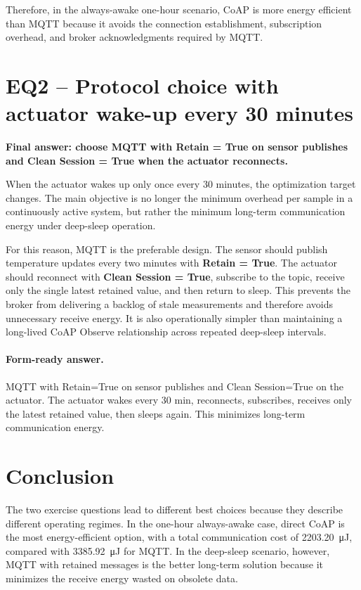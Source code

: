 \documentclass[11pt,a4paper]{article}
\begin{document}
Therefore, in the always-awake one-hour scenario, CoAP is more energy efficient than MQTT because it avoids the connection establishment, subscription overhead, and broker acknowledgments required by MQTT.

\section{EQ2 -- Protocol choice with actuator wake-up every 30 minutes}
\textbf{Final answer: choose MQTT with Retain = True on sensor publishes and Clean Session = True when the actuator reconnects.}

When the actuator wakes up only once every 30 minutes, the optimization target changes. The main objective is no longer the minimum overhead per sample in a continuously active system, but rather the minimum long-term communication energy under deep-sleep operation.

For this reason, MQTT is the preferable design. The sensor should publish temperature updates every two minutes with \textbf{Retain = True}. The actuator should reconnect with \textbf{Clean Session = True}, subscribe to the topic, receive only the single latest retained value, and then return to sleep. This prevents the broker from delivering a backlog of stale measurements and therefore avoids unnecessary receive energy. It is also operationally simpler than maintaining a long-lived CoAP Observe relationship across repeated deep-sleep intervals.

\paragraph{Form-ready answer.}
MQTT with Retain=True on sensor publishes and Clean Session=True on the actuator. The actuator wakes every 30 min, reconnects, subscribes, receives only the latest retained value, then sleeps again. This minimizes long-term communication energy.

\section{Conclusion}
The two exercise questions lead to different best choices because they describe different operating regimes. In the one-hour always-awake case, direct CoAP is the most energy-efficient option, with a total communication cost of \SI{2203.20}{\micro J}, compared with \SI{3385.92}{\micro J} for MQTT. In the deep-sleep scenario, however, MQTT with retained messages is the better long-term solution because it minimizes the receive energy wasted on obsolete data.
\end{document}
